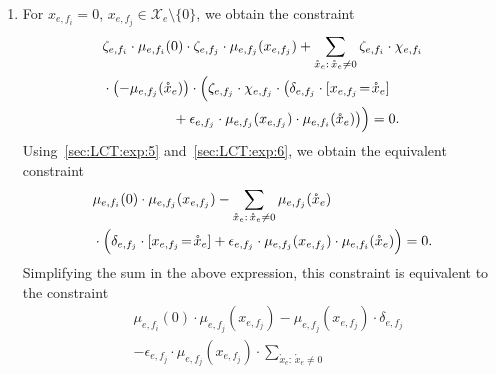 \documentclass[journal]{IEEEtran}
\newcommand{\set}[1]{\mathcal{#1}}
\newcommand{\LCT}[1]{ \mathring{#1} }
\newcommand{\efi}{ e,f_i }
\newcommand{\efj}{ e,f_j }
\begin{document}
\begin{appendices}
\begin{enumerate}
    \item For $x_{\efi} = 0$, $x_{\efj} \in \set{X}_e \setminus \{ 0 \}$, we obtain
          the constraint
          \begin{align*}
             &
            \zeta_{\efi}
            \cdot
            \mu_{\efi}(0)
            \cdot
            \zeta_{\efj}
            \cdot
            \mu_{\efj}(x_{\efj})
            +
            \sum_{\LCT{x}_e: \, \LCT{x}_e \neq 0}
            \zeta_{\efi}
            \cdot
            \chi_{\efi}
            \\
             &
            \cdot
            \bigl( - \mu_{\efj}(\LCT{x}_e) \bigr)
            \cdot
            \Bigl(
            \zeta_{\efj}
            \cdot
            \chi_{\efj}
            \cdot
            \bigl(
            \delta_{\efj}
            \cdot
            [x_{\efj} \!=\! \LCT{x}_e]
            \\
             &
            \qquad\quad\qquad
            +
            \epsilon_{\efj}
            \cdot
            \mu_{\efj}(x_{\efj})
            \cdot
            \mu_{\efi}(\LCT{x}_e)
            \bigr)
            \Bigr)
            = 0.
          \end{align*}
          Using~\eqref{sec:LCT:exp:5}
          and~\eqref{sec:LCT:exp:6}, we obtain the equivalent
          constraint
          \begin{align*}
             & \mu_{\efi}(0)
            \cdot
            \mu_{\efj}(x_{\efj})
            -
            \sum_{\LCT{x}_e: \, \LCT{x}_e \neq 0}
            \mu_{\efj}(\LCT{x}_e)
            \\
             & \cdot
            \Bigl(
            \delta_{\efj}
            \cdot
            [x_{\efj} \!=\! \LCT{x}_e]
            +
            \epsilon_{\efj}
            \cdot
            \mu_{\efj}(x_{\efj})
            \cdot
            \mu_{\efi}(\LCT{x}_e)
            \Bigr)
            = 0.
          \end{align*}
          Simplifying the sum in the above expression, this constraint is equivalent
          to the constraint
          \begin{align*}
             & \mu_{\efi}(0)
            \cdot
            \mu_{\efj}(x_{\efj})
            -
            \mu_{\efj}(x_{\efj})
            \cdot
            \delta_{\efj}
            \\
             & -
            \epsilon_{\efj}
            \cdot
            \mu_{\efj}(x_{\efj})
            \cdot
            \sum_{\LCT{x}_e: \, \LCT{x}_e \neq 0}

\end{align*}
\end{enumerate}
\end{appendices}
\end{document}
